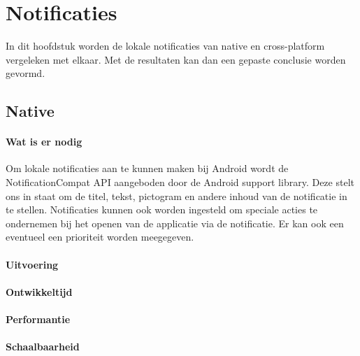 
\chapter{Notificaties}%
\label{ch:notificaties}

In dit hoofdstuk worden de lokale notificaties van native en cross-platform vergeleken met elkaar. 
Met de resultaten kan dan een gepaste conclusie worden gevormd.

\section{Native}
\subsubsection{Wat is er nodig}
Om lokale notificaties aan te kunnen maken bij Android wordt de NotificationCompat API aangeboden 
door de Android support library. Deze stelt ons in staat om de titel, tekst, pictogram en andere inhoud van de 
notificatie in te stellen. Notificaties kunnen ook worden ingesteld om speciale acties te ondernemen bij het openen 
van de applicatie via de notificatie. Er kan ook een eventueel een prioriteit worden meegegeven.

\subsubsection{Uitvoering}



\subsubsection{Ontwikkeltijd}



\subsubsection{Performantie}



\subsubsection{Schaalbaarheid}

